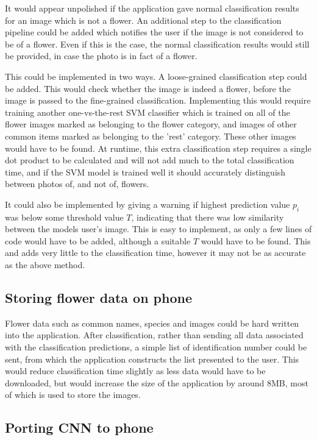 \documentclass[11pt, a4paper]{report}
\begin{document}
It would appear unpolished if the application gave normal classification results for an image which is not a flower. An additional step to the classification pipeline could be added which notifies the user if the image is not considered to be of a flower. Even if this is the case, the normal classification results would still be provided, in case the photo is in fact of a flower. 

This could be implemented in two ways. A loose-grained classification step could be added. This would check whether the image is indeed a flower, before the image is passed to the fine-grained classification. Implementing this would require training another one-vs-the-rest SVM classifier which is trained on all of the flower images marked as belonging to the flower category, and images of other common items marked as belonging to the 'rest' category. These other images would have to be found. At runtime, this extra classification step requires a single dot product to be calculated and will not add much to the total classification time, and if the SVM model is trained well it should accurately distinguish between photos of, and not of, flowers. 

It could also be implemented by giving a warning if highest prediction value $p_i$ was below some threshold value $T$, indicating that there was low similarity between the models user's image. This is easy to implement, as only a few lines of code would have to be added, although a suitable $T$ would have to be found. This and adds very little to the classification time, however it may not be as accurate as the above method. 

\subsection{Storing flower data on phone}
\label{sec:data_on_phone}

Flower data such as common names, species and images could be hard written into the application. After classification, rather than sending all data associated with the classification predictions, a simple list of identification number could be sent, from which the application constructs the list presented to the user. This would reduce classification time slightly as less data would have to be downloaded, but would increase the size of the application by around 8MB, most of which is used to store the images. 


\subsection{Porting CNN to phone}
\end{document}
